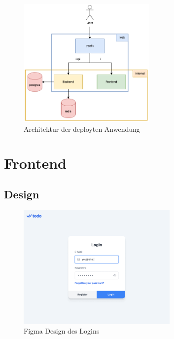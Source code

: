 \documentclass[a4paper, 12pt]{article}
\begin{document}
    \begin{figure}[H]
        \center\includegraphics[width=0.6\textwidth]{../images/architecture.drawio}
        \caption{Architektur der deployten Anwendung}\label{fig:figure}
    \end{figure}

    \section{Frontend}
    \subsection{Design}

    \begin{figure}[H]
        \center\includegraphics[width=0.7\textwidth]{../images/figma/login}
        \caption{Figma Design des Logins}\label{fig:figure}
    \end{figure}
\end{document}
